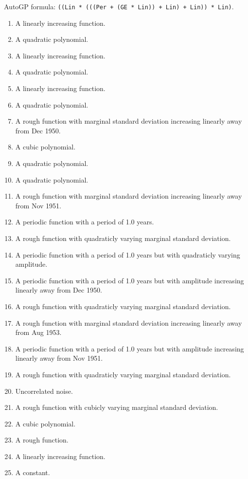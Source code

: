 \documentclass[11pt,a4paper]{article}
\begin{document}
AutoGP formula: \texttt{((Lin * (((Per + (GE * Lin)) + Lin) + Lin)) * Lin)}.
\begin{enumerate}
  \item A linearly increasing function.
  \item A quadratic polynomial.
  \item A linearly increasing function.
  \item A quadratic polynomial.
  \item A linearly increasing function.
  \item A quadratic polynomial.
  \item A rough function with marginal standard deviation increasing linearly away from Dec 1950.
  \item A cubic polynomial.
  \item A quadratic polynomial.
  \item A quadratic polynomial.
  \item A rough function with marginal standard deviation increasing linearly away from Nov 1951.
  \item A periodic function with a period of 1.0 years.
  \item A rough function with quadraticly varying marginal standard deviation.
  \item A periodic function with a period of 1.0 years but with quadraticly varying amplitude.
  \item A periodic function with a period of 1.0 years but with amplitude increasing linearly away from Dec 1950.
  \item A rough function with quadraticly varying marginal standard deviation.
  \item A rough function with marginal standard deviation increasing linearly away from Aug 1953.
  \item A periodic function with a period of 1.0 years but with amplitude increasing linearly away from Nov 1951.
  \item A rough function with quadraticly varying marginal standard deviation.
  \item Uncorrelated noise.
  \item A rough function with cubicly varying marginal standard deviation.
  \item A cubic polynomial.
  \item A rough function.
  \item A linearly increasing function.
  \item A constant.
\end{enumerate}
\end{document}

